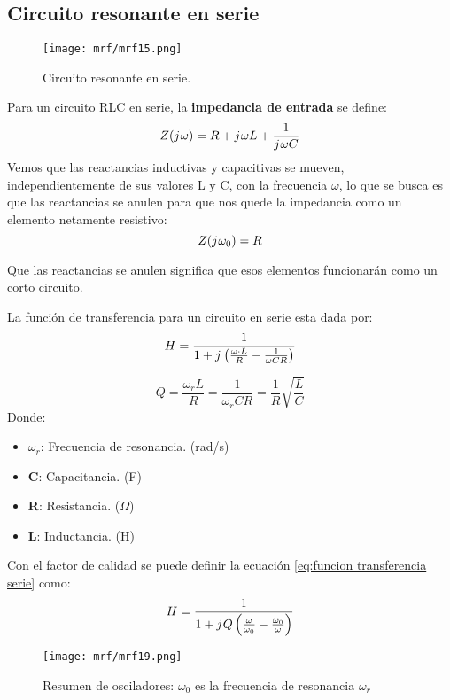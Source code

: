 \documentclass[
	12pt, %
	fleqn, %
	a4paper, %
	oneside, %
]{LegrandOrangeBook}
\begin{document}
\subsection*{Circuito resonante en serie}
\begin{figure}[H]
\centering
\texttt{[image: mrf/mrf15.png]}
\caption{Circuito resonante en serie.}
\end{figure}
Para un circuito RLC en serie, la \textbf{impedancia de entrada} se define:
\begin{equation}
Z({j\mkern1mu}\omega)=R+{j\mkern1mu}\omega L+\frac{1}{{j\mkern1mu}\omega C}
\end{equation}
Vemos que las reactancias inductivas y capacitivas se mueven, independientemente de sus valores L y C, con la frecuencia $\omega$, lo que se busca es que las reactancias se anulen para que nos quede la impedancia como un elemento netamente resistivo:
\begin{displaymath}
Z({j\mkern1mu}\omega_0)=R
\end{displaymath}
\begin{notation}
Que las reactancias se anulen significa que esos elementos funcionarán como un corto circuito.
\end{notation}
\begin{definition}
La función de transferencia para un circuito en serie esta dada por:
\begin{equation}
H=\frac{1}{1+{j\mkern1mu}\left(\frac{\omega\cdot L}{R}-\frac{1}{\omega CR}\right)}
\label{eq:funcion transferencia serie}
\end{equation}
\end{definition}
\begin{definition}
\begin{equation}
Q=\frac{\omega_r L}{R}=\frac{1}{\omega_rCR}=\frac{1}{R}\sqrt{\frac{L}{C}}
\label{eq:factor calidad serie}
\end{equation}
Donde:
\begin{itemize}
\item $\omega_r$: Frecuencia de resonancia. (rad/s)
\item \textbf{C}: Capacitancia. (F)
\item \textbf{R}: Resistancia. ($\Omega$)
\item \textbf{L}: Inductancia. (H)
\end{itemize}
\end{definition}
Con el factor de calidad se puede definir la ecuación \ref{eq:funcion transferencia serie} como:
\begin{equation}
H=\frac{1}{1+{j\mkern1mu} Q\left(\frac{\omega}{\omega_0}-\frac{\omega_0}{\omega}\right)}
\end{equation}
\begin{figure}[H]
\centering
\texttt{[image: mrf/mrf19.png]}
\caption{Resumen de osciladores: $\omega_0$ es la frecuencia de resonancia $\omega_r$}
\end{figure}
\end{document}
